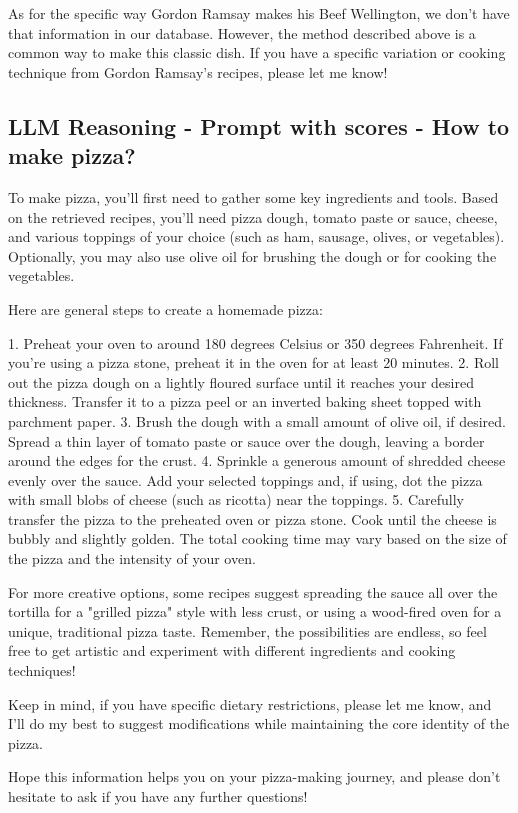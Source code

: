 \documentclass[a4paper,11pt]{article}
\begin{document}
As for the specific way Gordon Ramsay makes his Beef Wellington, we don't have that information in our database. However, the method described above is a common way to make this classic dish. If you have a specific variation or cooking technique from Gordon Ramsay's recipes, please let me know!

\subsection{LLM Reasoning - Prompt with scores - How to make pizza?}
To make pizza, you'll first need to gather some key ingredients and tools. Based on the retrieved recipes, you'll need pizza dough, tomato paste or sauce, cheese, and various toppings of your choice (such as ham, sausage, olives, or vegetables). Optionally, you may also use olive oil for brushing the dough or for cooking the vegetables.

Here are general steps to create a homemade pizza:

1. Preheat your oven to around 180 degrees Celsius or 350 degrees Fahrenheit. If you're using a pizza stone, preheat it in the oven for at least 20 minutes.
2. Roll out the pizza dough on a lightly floured surface until it reaches your desired thickness. Transfer it to a pizza peel or an inverted baking sheet topped with parchment paper.
3. Brush the dough with a small amount of olive oil, if desired. Spread a thin layer of tomato paste or sauce over the dough, leaving a border around the edges for the crust.
4. Sprinkle a generous amount of shredded cheese evenly over the sauce. Add your selected toppings and, if using, dot the pizza with small blobs of cheese (such as ricotta) near the toppings.
5. Carefully transfer the pizza to the preheated oven or pizza stone. Cook until the cheese is bubbly and slightly golden. The total cooking time may vary based on the size of the pizza and the intensity of your oven.

For more creative options, some recipes suggest spreading the sauce all over the tortilla for a "grilled pizza" style with less crust, or using a wood-fired oven for a unique, traditional pizza taste. Remember, the possibilities are endless, so feel free to get artistic and experiment with different ingredients and cooking techniques!

Keep in mind, if you have specific dietary restrictions, please let me know, and I'll do my best to suggest modifications while maintaining the core identity of the pizza.

Hope this information helps you on your pizza-making journey, and please don't hesitate to ask if you have any further questions!
\end{document}
